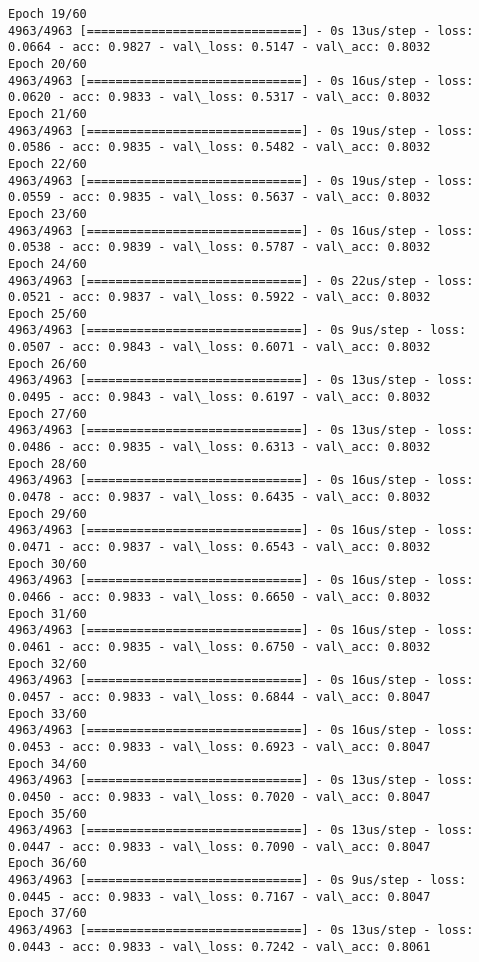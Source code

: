\documentclass[11pt]{article}
\begin{document}
\begin{Verbatim}[commandchars=\\\{\}]
Epoch 19/60
4963/4963 [==============================] - 0s 13us/step - loss: 0.0664 - acc: 0.9827 - val\_loss: 0.5147 - val\_acc: 0.8032
Epoch 20/60
4963/4963 [==============================] - 0s 16us/step - loss: 0.0620 - acc: 0.9833 - val\_loss: 0.5317 - val\_acc: 0.8032
Epoch 21/60
4963/4963 [==============================] - 0s 19us/step - loss: 0.0586 - acc: 0.9835 - val\_loss: 0.5482 - val\_acc: 0.8032
Epoch 22/60
4963/4963 [==============================] - 0s 19us/step - loss: 0.0559 - acc: 0.9835 - val\_loss: 0.5637 - val\_acc: 0.8032
Epoch 23/60
4963/4963 [==============================] - 0s 16us/step - loss: 0.0538 - acc: 0.9839 - val\_loss: 0.5787 - val\_acc: 0.8032
Epoch 24/60
4963/4963 [==============================] - 0s 22us/step - loss: 0.0521 - acc: 0.9837 - val\_loss: 0.5922 - val\_acc: 0.8032
Epoch 25/60
4963/4963 [==============================] - 0s 9us/step - loss: 0.0507 - acc: 0.9843 - val\_loss: 0.6071 - val\_acc: 0.8032
Epoch 26/60
4963/4963 [==============================] - 0s 13us/step - loss: 0.0495 - acc: 0.9843 - val\_loss: 0.6197 - val\_acc: 0.8032
Epoch 27/60
4963/4963 [==============================] - 0s 13us/step - loss: 0.0486 - acc: 0.9835 - val\_loss: 0.6313 - val\_acc: 0.8032
Epoch 28/60
4963/4963 [==============================] - 0s 16us/step - loss: 0.0478 - acc: 0.9837 - val\_loss: 0.6435 - val\_acc: 0.8032
Epoch 29/60
4963/4963 [==============================] - 0s 16us/step - loss: 0.0471 - acc: 0.9837 - val\_loss: 0.6543 - val\_acc: 0.8032
Epoch 30/60
4963/4963 [==============================] - 0s 16us/step - loss: 0.0466 - acc: 0.9833 - val\_loss: 0.6650 - val\_acc: 0.8032
Epoch 31/60
4963/4963 [==============================] - 0s 16us/step - loss: 0.0461 - acc: 0.9835 - val\_loss: 0.6750 - val\_acc: 0.8032
Epoch 32/60
4963/4963 [==============================] - 0s 16us/step - loss: 0.0457 - acc: 0.9833 - val\_loss: 0.6844 - val\_acc: 0.8047
Epoch 33/60
4963/4963 [==============================] - 0s 16us/step - loss: 0.0453 - acc: 0.9833 - val\_loss: 0.6923 - val\_acc: 0.8047
Epoch 34/60
4963/4963 [==============================] - 0s 13us/step - loss: 0.0450 - acc: 0.9833 - val\_loss: 0.7020 - val\_acc: 0.8047
Epoch 35/60
4963/4963 [==============================] - 0s 13us/step - loss: 0.0447 - acc: 0.9833 - val\_loss: 0.7090 - val\_acc: 0.8047
Epoch 36/60
4963/4963 [==============================] - 0s 9us/step - loss: 0.0445 - acc: 0.9833 - val\_loss: 0.7167 - val\_acc: 0.8047
Epoch 37/60
4963/4963 [==============================] - 0s 13us/step - loss: 0.0443 - acc: 0.9833 - val\_loss: 0.7242 - val\_acc: 0.8061

\end{Verbatim}
\end{document}
